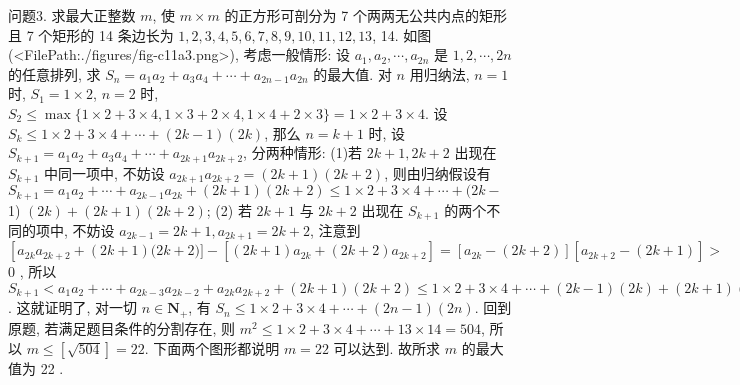 问题3. 求最大正整数 $m$, 使 $m \times m$ 的正方形可剖分为 7 个两两无公共内点的矩形且 7 个矩形的 14 条边长为 $1,2,3,4,5,6,7,8,9,10,11,12,13$, 14.
如图(<FilePath:./figures/fig-c11a3.png>), 考虑一般情形: 设 $a_1, a_2, \cdots, a_{2 n}$ 是 $1,2, \cdots, 2 n$ 的任意排列, 求 $S_n= a_1 a_2+a_3 a_4+\cdots+a_{2 n-1} a_{2 n}$ 的最大值.
对 $n$ 用归纳法, $n=1$ 时, $S_1=1 \times 2$, $n=2$ 时, $S_2 \leqslant \max \{1 \times 2+3 \times 4,1 \times 3+2 \times 4,1 \times 4+2 \times 3\}=1 \times 2+ 3 \times 4$. 设 $S_k \leqslant 1 \times 2+3 \times 4+\cdots+(2 k-1)(2 k)$, 那么 $n=k+1$ 时, 设 $S_{k+1}=a_1 a_2+a_3 a_4+\cdots+a_{2 k+1} a_{2 k+2}$, 分两种情形: (1)若 $2 k+1,2 k+2$ 出现在 $S_{k+1}$ 中同一项中, 不妨设 $a_{2 k+1} a_{2 k+2}=(2 k+1)(2 k+2)$, 则由归纳假设有 $S_{k+1}=a_1 a_2+\cdots+a_{2 k-1} a_{2 k}+(2 k+1)(2 k+2) \leqslant 1 \times 2+3 \times 4+\cdots+(2 k-$ 1) $(2 k)+(2 k+1)(2 k+2)$; (2) 若 $2 k+1$ 与 $2 k+2$ 出现在 $S_{k+1}$ 的两个不同的项中, 不妨设 $a_{2 k-1}=2 k+1, a_{2 k+1}=2 k+2$, 注意到 $\left[a_{2 k} a_{2 k+2}+(2 k+1)(2 k+\right. 2)]-\left[(2 k+1) a_{2 k}+(2 k+2) a_{2 k+2}\right]=\left[a_{2 k}-(2 k+2)\right]\left[a_{2 k+2}-(2 k+1)\right]>$ 0 , 所以 $S_{k+1}<a_1 a_2+\cdots+a_{2 k-3} a_{2 k-2}+a_{2 k} a_{2 k+2}+(2 k+1)(2 k+2) \leqslant 1 \times 2+ 3 \times 4+\cdots+(2 k-1)(2 k)+(2 k+1)(2 k+2)$. 这就证明了, 对一切 $n \in \mathbf{N}_{+}$, 有 $S_n \leqslant 1 \times 2+3 \times 4+\cdots+(2 n-1)(2 n)$. 回到原题, 若满足题目条件的分割存在, 则 $m^2 \leqslant 1 \times 2+3 \times 4+\cdots+13 \times 14=504$, 所以 $m \leqslant[\sqrt{504}]=22$. 下面两个图形都说明 $m=22$ 可以达到.
故所求 $m$ 的最大值为 22 .



